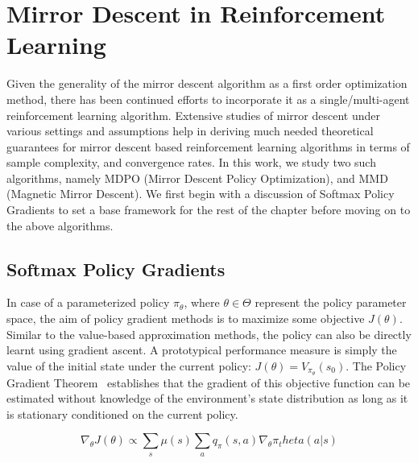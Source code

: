 \chapter{Mirror Descent in Reinforcement Learning}

Given the generality of the mirror descent algorithm as a first order optimization method, there
has been continued efforts to incorporate it as a single/multi-agent reinforcement learning
algorithm.
Extensive studies of mirror descent under various settings and assumptions help in deriving much
needed theoretical guarantees for mirror descent based reinforcement learning algorithms in terms
of sample complexity, and convergence rates.
In this work, we study two such algorithms, namely MDPO (Mirror Descent Policy Optimization), and
MMD (Magnetic Mirror Descent).
We first begin with a discussion of Softmax Policy Gradients to set a base framework for the rest
of the chapter before moving on to the above algorithms.


\section[SPG]{Softmax Policy Gradients}
\label{sec:spg}
In case of a parameterized policy $\pi_\theta$, where $\theta \in \Theta$ represent the policy
parameter space, the aim of policy gradient methods is to maximize some objective $J(\theta)$.
Similar to the value-based approximation methods, the policy can also be directly learnt using
gradient ascent.
A prototypical performance measure is simply the value of the initial state under the current
policy: $J(\theta) = V_{\pi_\theta}(s_0)$.
The Policy Gradient Theorem~\cite[Chapter 13.2]{suttonReinforcement2018} establishes that the
gradient of this objective function can be estimated without knowledge of the environment's state
distribution as long as it is stationary conditioned on the current policy.

$$ \nabla_\theta J(\theta) \propto \sum_s \mu(s) \sum_a q_\pi(s,a) \nabla_\theta \pi_theta(a|s) $$

